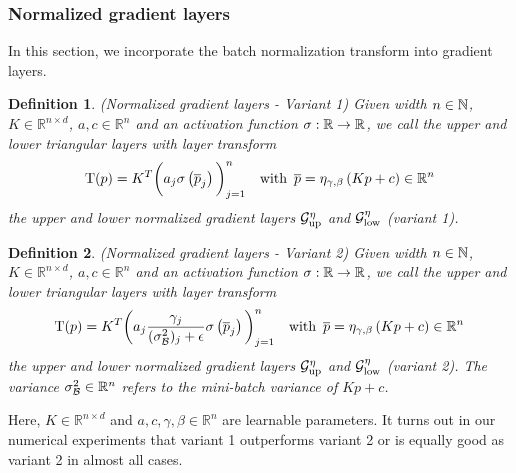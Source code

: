 \documentclass[twoside,a4paper]{article}
\newtheorem{definition}{Definition}
\begin{document}
\subsubsection{Normalized gradient layers}

In this section, we incorporate the batch normalization transform into gradient layers.

\begin{definition}\label{def_norm_gradient_layers_1}
	(Normalized gradient layers - Variant 1)
	Given width $n \in \mathbb{N}$, $K \in \mathbb{R}^{n \times d}$, $a,c \in \mathbb{R}^n$ and
	an activation function $\sigma : \mathbb{R} \to \mathbb{R}$,
	we call the upper and lower triangular layers with layer transform
	\begin{equation*}
		\mathrm{T}(p) = K^T \bigg( a_j \sigma
		\left( \overline{p}_j \right) \bigg)_{j=1}^n
		\quad \text{with } \, \overline{p} = \eta_{\gamma, \beta} \left( Kp + c \right) \in \mathbb{R}^n
	\end{equation*}
	the upper and lower normalized gradient layers 
	$\mathcal{G}_{\text{up}}^{\eta}$ and $\mathcal{G}_{\text{low}}^{\eta}$ (variant 1).
\end{definition}

\begin{definition}\label{def_norm_gradient_layers_2}
	(Normalized gradient layers - Variant 2)
	Given width $n \in \mathbb{N}$, $K \in \mathbb{R}^{n \times d}$, $a,c \in \mathbb{R}^n$ and
	an activation function $\sigma : \mathbb{R} \to \mathbb{R}$,
	we call the upper and lower triangular layers with layer transform
	\begin{equation*}
		\mathrm{T}(p) = K^T \bigg( a_j \frac{\gamma_j}{(\sigma^2_\mathcal{B})_j + \epsilon}
		\sigma \left( \overline{p}_j \right) \bigg)_{j=1}^n
		\quad \text{with } \, \overline{p} = \eta_{\gamma, \beta} \left( Kp + c \right) \in \mathbb{R}^n
	\end{equation*}
	the upper and lower normalized gradient layers 
	$\mathcal{G}_{\text{up}}^{\eta}$ and $\mathcal{G}_{\text{low}}^{\eta}$ (variant 2).
	The variance $\sigma^2_\mathcal{B} \in \mathbb{R}^n$ refers to the mini-batch variance of $Kp+c$.
\end{definition}

Here, $K \in \mathbb{R}^{n \times d}$ and $a,c, \gamma, \beta \in \mathbb{R}^n$
are learnable parameters.
It turns out in our numerical experiments that variant 1 outperforms
variant 2 or is equally good as variant 2 in almost all cases.
\end{document}
